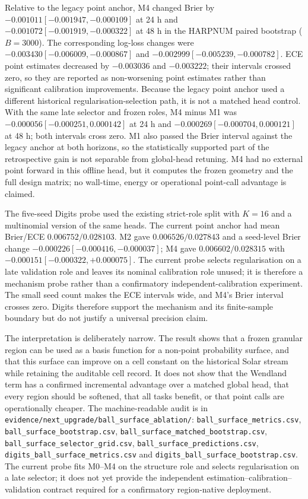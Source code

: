 \documentclass[11pt,a4paper]{article}
\numberwithin{equation}{section}
\theoremstyle{definition}\newtheorem{definition}[theorem]{Definition}
\theoremstyle{remark}\newtheorem{remark}[theorem]{Remark}
\begin{document}
Relative to the legacy point anchor, M4 changed Brier by $-0.001011[-0.001947,-0.000109]$ at 24 h and $-0.001072[-0.001919,-0.000322]$ at 48 h in the HARPNUM paired bootstrap ($B=3000$). The corresponding log-loss changes were $-0.003430[-0.006009,-0.000867]$ and $-0.002999[-0.005239,-0.000782]$. ECE point estimates decreased by $-0.003036$ and $-0.003222$; their intervals crossed zero, so they are reported as non-worsening point estimates rather than significant calibration improvements. Because the legacy point anchor used a different historical regularisation-selection path, it is not a matched head control. With the same late selector and frozen roles, M4 minus M1 was $-0.000056[-0.000251,0.000142]$ at 24 h and $-0.000269[-0.000704,0.000121]$ at 48 h; both intervals cross zero. M1 also passed the Brier interval against the legacy anchor at both horizons, so the statistically supported part of the retrospective gain is not separable from global-head retuning. M4 had no external point forward in this offline head, but it computes the frozen geometry and the full design matrix; no wall-time, energy or operational point-call advantage is claimed.

The five-seed Digits probe used the existing strict-role split with $K=16$ and a multinomial version of the same heads. The current point anchor had mean Brier/ECE $0.006752/0.028103$. M2 gave $0.006526/0.027843$ and a seed-level Brier change $-0.000226[-0.000416,-0.000037]$; M4 gave $0.006602/0.028315$ with $-0.000151[-0.000322,+0.000075]$. The current probe selects regularisation on a late validation role and leaves its nominal calibration role unused; it is therefore a mechanism probe rather than a confirmatory independent-calibration experiment. The small seed count makes the ECE intervals wide, and M4's Brier interval crosses zero. Digits therefore support the mechanism and its finite-sample boundary but do not justify a universal precision claim.

The interpretation is deliberately narrow. The result shows that a frozen granular region can be used as a basis function for a non-point probability surface, and that this surface can improve on a cell constant on the historical Solar stream while retaining the auditable cell record. It does not show that the Wendland term has a confirmed incremental advantage over a matched global head, that every region should be softened, that all tasks benefit, or that point calls are operationally cheaper. The machine-readable audit is in \texttt{evidence/next\_upgrade/ball\_surface\_ablation/}: \texttt{ball\_surface\_metrics.csv}, \texttt{ball\_surface\_bootstrap.csv}, \texttt{ball\_surface\_matched\_bootstrap.csv}, \texttt{ball\_surface\_selector\_grid.csv}, \texttt{ball\_surface\_predictions.csv}, \texttt{digits\_ball\_surface\_metrics.csv} and \texttt{digits\_ball\_surface\_bootstrap.csv}. The current probe fits M0--M4 on the structure role and selects regularisation on a late selector; it does not yet provide the independent estimation--calibration--validation contract required for a confirmatory region-native deployment.
\end{document}
